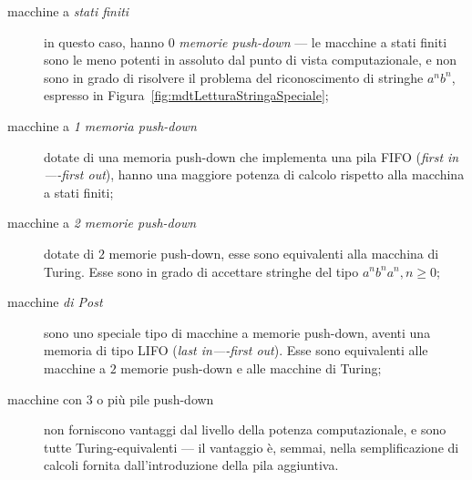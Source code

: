 \documentclass[10pt]{\classname}
\theoremstyle{definition}
\theoremstyle{definition}
\theoremstyle{definition}
\theoremstyle{definition}
\begin{document}
\begin{description}
    \item[macchine a \emph{stati finiti}] in questo caso, hanno $0$
        \emph{memorie push-down} --- le macchine a stati finiti sono le meno
        potenti in assoluto dal punto di vista computazionale, e non sono in
        grado di risolvere il problema del riconoscimento di stringhe $a^n
        b^n$, espresso in Figura~\ref{fig:mdtLetturaStringaSpeciale};
    \item[macchine a \emph{1 memoria push-down}] dotate di una memoria
        push-down che implementa una pila FIFO (\emph{first in----first out}),
        hanno una maggiore potenza di calcolo rispetto alla macchina a stati
        finiti;
    \item[macchine a \emph{2 memorie push-down}] dotate di $2$ memorie
        push-down, esse sono equivalenti alla macchina di Turing. Esse sono in grado di accettare stringhe del tipo $a^nb^na^n, n\geq 0$;
    \item[macchine \emph{di Post}] sono uno speciale tipo di macchine a memorie
        push-down, aventi una memoria di tipo LIFO (\emph{last in----first
        out}). Esse sono equivalenti alle macchine a $2$ memorie push-down e
        alle macchine di Turing;
    \item[macchine con 3 o più pile push-down] non forniscono vantaggi dal
        livello della potenza computazionale, e sono tutte Turing-equivalenti
        --- il vantaggio è, semmai, nella semplificazione di calcoli fornita
        dall'introduzione della pila aggiuntiva.
\end{description}
\end{document}
